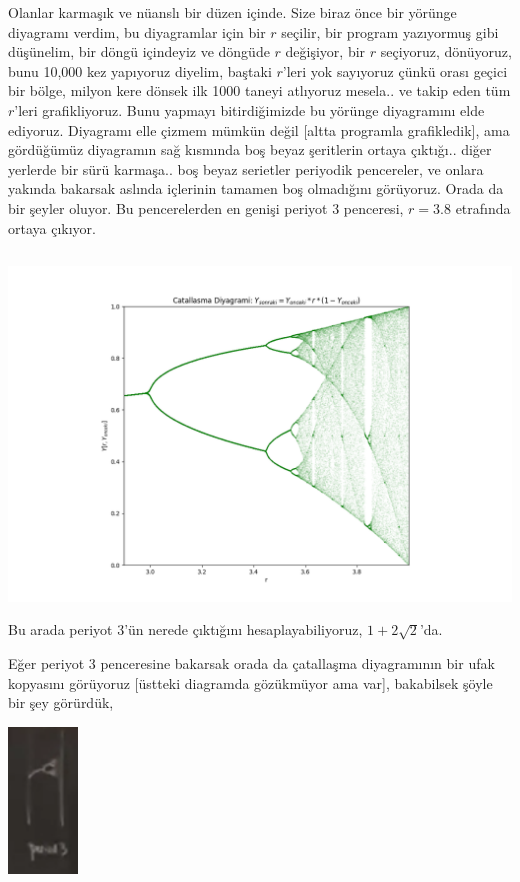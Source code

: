 \documentclass[12pt,fleqn]{article}\usepackage{../../common}
\begin{document}
Olanlar karmaşık ve nüanslı bir düzen içinde. Size biraz önce bir yörünge
diyagramı verdim, bu diyagramlar için bir $r$ seçilir, bir program
yazıyormuş gibi düşünelim, bir döngü içindeyiz ve döngüde $r$ değişiyor,
bir $r$ seçiyoruz, dönüyoruz, bunu 10,000 kez yapıyoruz diyelim, baştaki
$r$'leri yok sayıyoruz çünkü orası geçici bir bölge, milyon kere dönsek ilk
1000 taneyi atlıyoruz mesela.. ve takip eden tüm $r$'leri
grafikliyoruz. Bunu yapmayı bitirdiğimizde bu yörünge diyagramını elde
ediyoruz. Diyagramı elle çizmem mümkün değil [altta programla grafikledik],
ama gördüğümüz diyagramın sağ kısmında boş beyaz şeritlerin ortaya
çıktığı.. diğer yerlerde bir sürü karmaşa.. boş beyaz serietler periyodik
pencereler, ve onlara yakında bakarsak aslında içlerinin tamamen boş
olmadığını görüyoruz. Orada da bir şeyler oluyor.  Bu pencerelerden en
genişi periyot 3 penceresi, $r=3.8$ etrafında ortaya çıkıyor. 

\inputminted[fontsize=\footnotesize]{python}{bifur.py}

\includegraphics[width=40em]{19_08.png}

Bu arada periyot 3'ün nerede çıktığını hesaplayabiliyoruz,
$1+2\sqrt{2}$'da.

Eğer periyot 3 penceresine bakarsak orada da çatallaşma diyagramının bir
ufak kopyasını görüyoruz [üstteki diagramda gözükmüyor ama var], bakabilsek
şöyle bir şey görürdük,

\includegraphics[width=5em]{19_09.png}
\end{document}
